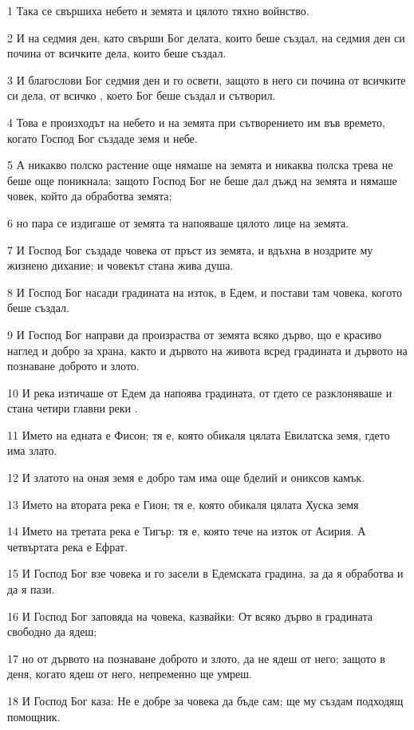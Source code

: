 \par 1 Така се свършиха небето и земята и цялото тяхно войнство.
\par 2 И на седмия ден, като свърши Бог делата, които беше създал, на седмия ден си почина от всичките дела, които беше създал.
\par 3 И благослови Бог седмия ден и го освети, защото в него си почина от всичките си дела, от всичко , което Бог беше създал и сътворил.
\par 4 Това е произходът на небето и на земята при сътворението им във времето, когато Господ Бог създаде земя и небе.
\par 5 А никакво полско растение още нямаше на земята и никаква полска трева не беше още поникнала; защото Господ Бог не беше дал дъжд на земята и нямаше човек, който да обработва земята;
\par 6 но пара се издигаше от земята та напояваше цялото лице на земята.
\par 7 И Господ Бог създаде човека от пръст из земята, и вдъхна в ноздрите му жизнено дихание; и човекът стана жива душа.
\par 8 И Господ Бог насади градината на изток, в Едем, и постави там човека, когото беше създал.
\par 9 И Господ Бог направи да произраства от земята всяко дърво, що е красиво наглед и добро за храна, както и дървото на живота всред градината и дървото на познаване доброто и злото.
\par 10 И река изтичаше от Едем да напоява градината, от гдето се разклоняваше и стана четири главни реки .
\par 11 Името на едната е Фисон; тя е, която обикаля цялата Евилатска земя, гдето има злато.
\par 12 И златото на оная земя е добро там има още бделий и ониксов камък.
\par 13 Името на втората река е Гион; тя е, която обикаля цялата Хуска земя
\par 14 Името на третата река е Тигър: тя е, която тече на изток от Асирия. А четвъртата река е Ефрат.
\par 15 И Господ Бог взе човека и го засели в Едемската градина, за да я обработва и да я пази.
\par 16 И Господ Бог заповяда на човека, казвайки: От всяко дърво в градината свободно да ядеш;
\par 17 но от дървото на познаване доброто и злото, да не ядеш от него; защото в деня, когато ядеш от него, непременно ще умреш.
\par 18 И Господ Бог каза: Не е добре за човека да бъде сам; ще му създам подходящ помощник.
